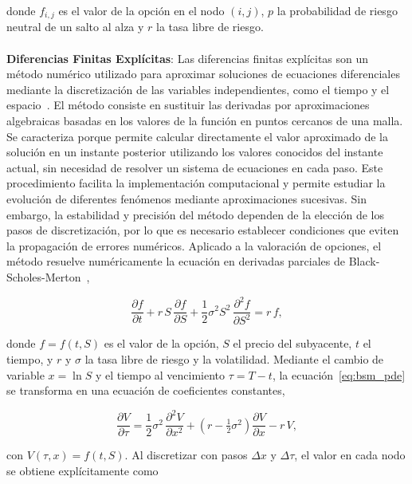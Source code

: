 \documentclass{article}
\begin{document}
donde $f_{i,j}$ es el valor de la opción en el nodo $(i,j)$, $p$ la probabilidad de riesgo neutral de un salto al alza y $r$ la tasa libre de riesgo.
\\
\\
\textbf{Diferencias Finitas Explícitas}: Las diferencias finitas explícitas son un método numérico utilizado para aproximar soluciones de ecuaciones diferenciales mediante la discretización de las variables independientes, como el tiempo y el espacio~\cite{gurevich2008numerical}. El método consiste en sustituir las derivadas por aproximaciones algebraicas basadas en los valores de la función en puntos cercanos de una malla. Se caracteriza porque permite calcular directamente el valor aproximado de la solución en un instante posterior utilizando los valores conocidos del instante actual, sin necesidad de resolver un sistema de ecuaciones en cada paso. Este procedimiento facilita la implementación computacional y permite estudiar la evolución de diferentes fenómenos mediante aproximaciones sucesivas. Sin embargo, la estabilidad y precisión del método dependen de la elección de los pasos de discretización, por lo que es necesario establecer condiciones que eviten la propagación de errores numéricos. Aplicado a la valoración de opciones, el método resuelve numéricamente la ecuación en derivadas parciales de Black-Scholes-Merton~\cite{gurevich2008numerical, marin2025metodos},

\begin{equation}
\frac{\partial f}{\partial t}+r\,S\,\frac{\partial f}{\partial S}+\frac{1}{2}\sigma^2 S^2\,\frac{\partial^2 f}{\partial S^2}=r\,f,
\label{eq:bsm_pde}
\end{equation}

donde $f=f(t,S)$ es el valor de la opción, $S$ el precio del subyacente, $t$ el tiempo, y $r$ y $\sigma$ la tasa libre de riesgo y la volatilidad. Mediante el cambio de variable $x=\ln S$ y el tiempo al vencimiento $\tau=T-t$, la ecuación~\eqref{eq:bsm_pde} se transforma en una ecuación de coeficientes constantes,

\begin{equation}
\frac{\partial V}{\partial \tau}=\frac{1}{2}\sigma^2\,\frac{\partial^2 V}{\partial x^2}
+\left(r-\tfrac{1}{2}\sigma^2\right)\frac{\partial V}{\partial x}-r\,V,
\label{eq:bsm_logprecio}
\end{equation}

con $V(\tau,x)=f(t,S)$. Al discretizar con pasos $\Delta x$ y $\Delta\tau$, el valor en cada nodo se obtiene explícitamente como
\end{document}
